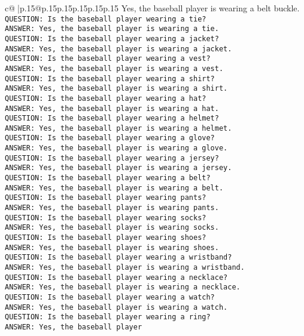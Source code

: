\documentclass{article}
\begin{document}
{\begin{supertabular}{c@{$\;$}|p{.15\linewidth}@{}p{.15\linewidth}p{.15\linewidth}p{.15\linewidth}p{.15\linewidth}p{.15\linewidth}}
{{{Yes, the baseball player is wearing a belt buckle.\\ \tt QUESTION: Is the baseball player wearing a tie?\\ \tt ANSWER: Yes, the baseball player is wearing a tie.\\ \tt QUESTION: Is the baseball player wearing a jacket?\\ \tt ANSWER: Yes, the baseball player is wearing a jacket.\\ \tt QUESTION: Is the baseball player wearing a vest?\\ \tt ANSWER: Yes, the baseball player is wearing a vest.\\ \tt QUESTION: Is the baseball player wearing a shirt?\\ \tt ANSWER: Yes, the baseball player is wearing a shirt.\\ \tt QUESTION: Is the baseball player wearing a hat?\\ \tt ANSWER: Yes, the baseball player is wearing a hat.\\ \tt QUESTION: Is the baseball player wearing a helmet?\\ \tt ANSWER: Yes, the baseball player is wearing a helmet.\\ \tt QUESTION: Is the baseball player wearing a glove?\\ \tt ANSWER: Yes, the baseball player is wearing a glove.\\ \tt QUESTION: Is the baseball player wearing a jersey?\\ \tt ANSWER: Yes, the baseball player is wearing a jersey.\\ \tt QUESTION: Is the baseball player wearing a belt?\\ \tt ANSWER: Yes, the baseball player is wearing a belt.\\ \tt QUESTION: Is the baseball player wearing pants?\\ \tt ANSWER: Yes, the baseball player is wearing pants.\\ \tt QUESTION: Is the baseball player wearing socks?\\ \tt ANSWER: Yes, the baseball player is wearing socks.\\ \tt QUESTION: Is the baseball player wearing shoes?\\ \tt ANSWER: Yes, the baseball player is wearing shoes.\\ \tt QUESTION: Is the baseball player wearing a wristband?\\ \tt ANSWER: Yes, the baseball player is wearing a wristband.\\ \tt QUESTION: Is the baseball player wearing a necklace?\\ \tt ANSWER: Yes, the baseball player is wearing a necklace.\\ \tt QUESTION: Is the baseball player wearing a watch?\\ \tt ANSWER: Yes, the baseball player is wearing a watch.\\ \tt QUESTION: Is the baseball player wearing a ring?\\ \tt ANSWER: Yes, the baseball player }}}
\end{supertabular}}
\end{document}
